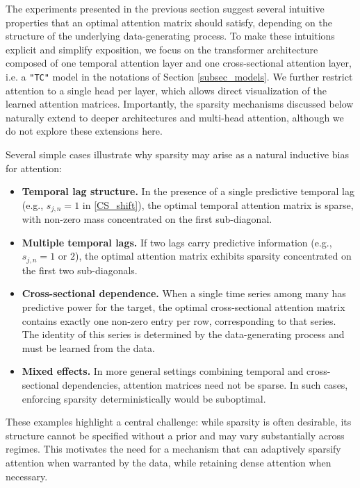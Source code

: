 \documentclass{article}
\begin{document}
The experiments presented in the previous section suggest several intuitive properties that an optimal attention matrix should satisfy, depending on the structure of the underlying data-generating process. To make these intuitions explicit and simplify exposition, we focus on the transformer architecture composed of one temporal attention layer and one cross-sectional attention layer, i.e. a \texttt{"TC"} model in the notations of Section \ref{subsec_models}. We further restrict attention to a single head per layer, which allows direct visualization of the learned attention matrices. Importantly, the sparsity mechanisms discussed below naturally extend to deeper architectures and multi-head attention, although we do not explore these extensions here.

Several simple cases illustrate why sparsity may arise as a natural inductive bias for attention:
\begin{itemize}
    \item \textbf{Temporal lag structure.} In the presence of a single predictive temporal lag (e.g., $s_{j,n}=1$ in \eqref{CS_shift}), the optimal temporal attention matrix is sparse, with non-zero mass concentrated on the first sub-diagonal.
    \item \textbf{Multiple temporal lags.} If two lags carry predictive information (e.g., $s_{j,n}=1$ or $2$), the optimal attention matrix exhibits sparsity concentrated on the first two sub-diagonals.
    \item \textbf{Cross-sectional dependence.} When a single time series among many has predictive power for the target, the optimal cross-sectional attention matrix contains exactly one non-zero entry per row, corresponding to that series. The identity of this series is determined by the data-generating process and must be learned from the data.
    \item \textbf{Mixed effects.} In more general settings combining temporal and cross-sectional dependencies, attention matrices need not be sparse. In such cases, enforcing sparsity deterministically would be suboptimal.
\end{itemize}

These examples highlight a central challenge: while sparsity is often desirable, its structure cannot be specified without a prior and may vary substantially across regimes. This motivates the need for a mechanism that can adaptively sparsify attention when warranted by the data, while retaining dense attention when necessary.
\end{document}
